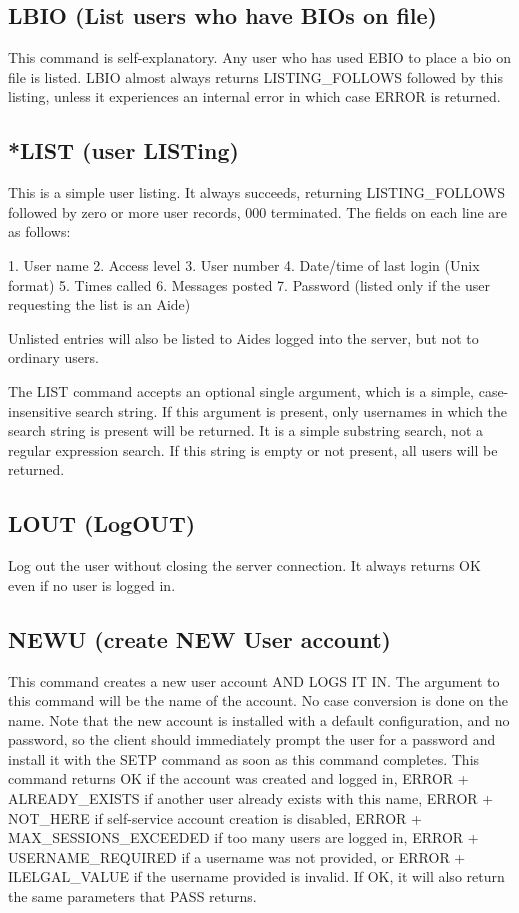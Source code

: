 \subsection{LBIO (List users who have BIOs on file)}

 This command is self-explanatory.  Any user who has used EBIO to place a bio
on file is listed.  LBIO almost always returns LISTING_FOLLOWS followed by
this listing, unless it experiences an internal error in which case ERROR
is returned.



\subsection{*LIST (user LISTing)}

 This is a simple user listing.  It always succeeds, returning
LISTING_FOLLOWS followed by zero or more user records, 000 terminated.  The
fields on each line are as follows:

 1. User name
 2. Access level
 3. User number
 4. Date/time of last login (Unix format)
 5. Times called
 6. Messages posted
 7. Password (listed only if the user requesting the list is an Aide)

 Unlisted entries will also be listed to Aides logged into the server, but
not to ordinary users.

 The LIST command accepts an optional single argument, which is a simple,
case-insensitive search string.  If this argument is present, only usernames
in which the search string is present will be returned.  It is a simple
substring search, not a regular expression search.  If this string is empty
or not present, all users will be returned.



\subsection{LOUT (LogOUT)}

 Log out the user without closing the server connection.  It always returns
OK even if no user is logged in.



\subsection{NEWU (create NEW User account)}

 This command creates a new user account AND LOGS IT IN.  The argument to
this command will be the name of the account.  No case conversion is done
on the name.  Note that the new account is installed with a default
configuration, and no password, so the client should immediately prompt the
user for a password and install it with the SETP command as soon as this
command completes.  This command returns OK if the account was created and
logged in, ERROR + ALREADY_EXISTS if another user already exists with this
name, ERROR + NOT_HERE if self-service account creation is disabled,
ERROR + MAX_SESSIONS_EXCEEDED if too many users are logged in, ERROR +
USERNAME_REQUIRED if a username was not provided, or ERROR + ILELGAL_VALUE
if the username provided is invalid.  If OK, it will also return the same
parameters that PASS returns.

